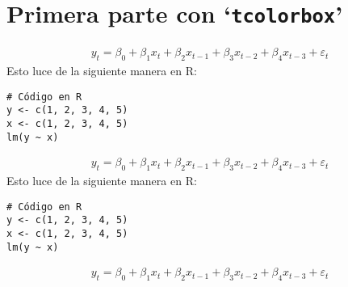 

\section{Primera parte con `\texttt{tcolorbox}'}

\lipsum[2]

\begin{tcolorbox}[colback=main!5!white, colframe=main!75!black, title=\textbf{Definición con código}, toptitle=1.5mm, bottomtitle=1.5mm, breakable]
    \lipsum[2] \begin{align*}
        y_t = \beta_0 + \beta_1 x_t + \beta_2 x_{t-1} + \beta_3 x_{t-2} + \beta_4 x_{t-3} + \varepsilon_t
    \end{align*}
    Esto luce de la siguiente manera en R:
    \begin{lstlisting}[style=R]
# Código en R
y <- c(1, 2, 3, 4, 5)
x <- c(1, 2, 3, 4, 5)
lm(y ~ x)
    \end{lstlisting}
    
\end{tcolorbox}

\begin{tcolorbox}[colback=secondary!5!white, colframe=secondary!75!black, title=\textbf{Nota con código}, toptitle=1.5mm, bottomtitle=1.5mm, breakable]
    \lipsum[3] \begin{align*}
        y_t = \beta_0 + \beta_1 x_t + \beta_2 x_{t-1} + \beta_3 x_{t-2} + \beta_4 x_{t-3} + \varepsilon_t
    \end{align*}
    Esto luce de la siguiente manera en R:
    \begin{lstlisting}[style=R]
# Código en R
y <- c(1, 2, 3, 4, 5)
x <- c(1, 2, 3, 4, 5)
lm(y ~ x)
    \end{lstlisting}

    \lipsum[4]

    \tcblower
    \lipsum[5]

\end{tcolorbox}

\begin{tcolorbox}[colback=tertiary!5!white, colframe=tertiary!75!black, title=\textbf{Ejemplo con Código}, toptitle=1.5mm, bottomtitle=1.5mm, breakable]
    \lipsum[6] \begin{align*}
        y_t = \beta_0 + \beta_1 x_t + \beta_2 x_{t-1} + \beta_3 x_{t-2} + \beta_4 x_{t-3} + \varepsilon_t
    \end{align*}
    \lipsum[7]
\end{tcolorbox}

